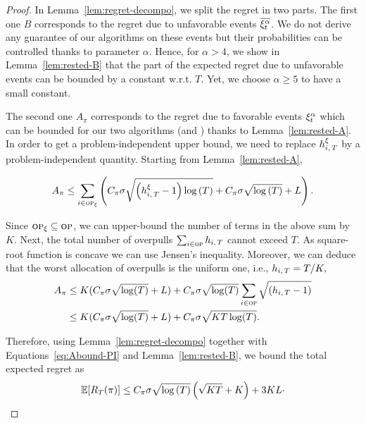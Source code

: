 \begin{proof}
In Lemma~\ref{lem:regret-decompo}, we split the regret in two parts. The first one $B$ corresponds to the regret due to unfavorable events $\overline{\xi^\alpha_t}$. We do not derive any guarantee of our algorithms on these events but their probabilities can be controlled thanks to parameter $\alpha$. Hence, for $\alpha > 4$, we show in Lemma~\ref{lem:rested-B} that the part of the expected regret due to unfavorable events can be bounded by a constant w.r.t. $T$. Yet, we choose $\alpha \geq 5$ to have a small constant.

The second one $A_\pi$ corresponds to the regret due to favorable events $\xi^\alpha_t$ which can be bounded for our two algorithms (\FEWA and \RUCB) thanks to Lemma~\ref{lem:rested-A}. In order to get a problem-independent upper bound, we need to replace $h_{i,\,T}^\xi$ by a problem-independent quantity. Starting from Lemma~\ref{lem:rested-A},

\begin{equation*}
A_{\pi} \leq \sum_{i\in \textsc{op}_\xi} \left(C_\pi \sigma \sqrt{\left(h_{i,\,T}^\xi -1\right)\log\left(T\right)} +C_\pi \sigma\sqrt{\log{\left(T\right)}}+  L\right).
\end{equation*}

Since $\textsc{op}_\xi \subseteq \textsc{op}$, we can upper-bound the number of terms in the above sum by  $K$.
Next, the total number of overpulls $\sum_{i\in\textsc{op}} h_{i,\,T}$ cannot exceed $T$. 
As square-root function is concave we can use Jensen's inequality. 
Moreover, we can deduce that the worst allocation of overpulls is the uniform one, i.e., $h_{i,\,T} = T/K,$
\begin{align}
A_{\pi} &\leq K(C_\pi \sigma\sqrt{\log(T)} + L) + C_\pi \sigma\sqrt{\log(T)} \sum_{i\in \textsc{op}} \sqrt{(h_{i,\,T} - 1)}\nonumber\\ 
&\leq K (C_\pi \sigma\sqrt{\log(T)} + L) + C_\pi \sigma\sqrt{KT\log(T)}.
\label{eq:Abound-PI}
\end{align}

Therefore, using Lemma~\ref{lem:regret-decompo} together with Equations~\ref{eq:Abound-PI} and Lemma~\ref{lem:rested-B}, we bound the total expected regret as
\begin{equation}
\mathbb{E}[R_T(\pi)] \leq C_\pi \sigma\sqrt{\log\left(T\right)}\left(\sqrt{KT} +K\right) + 3KL\cdot
\end{equation}
\end{proof}

